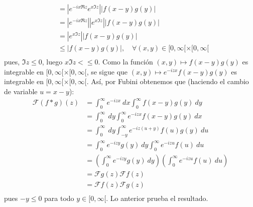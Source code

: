 \documentclass[12pt]{report}
\theoremstyle{largebreak}
\renewcommand{\leq}{\ensuremath{\leqslant}}
\newcommand\abs[1]{\ensuremath{\left|#1\right|}}
\newcommand{\fou}[1]{\ensuremath{\mathcal{F}#1}}
\begin{document}
\begin{sol}
\begin{equation*}
\begin{split}
                &=\abs{e^{ -ix\Re z}e^{x\Im z}}\abs{f(x-y)g(y)}\\
                &=\abs{e^{ -ix\Re z}}\abs{e^{x\Im z}}\abs{f(x-y)g(y)}\\
                &=\abs{e^{x\Im z}}\abs{f(x-y)g(y)}\\
                &\leq\abs{f(x-y)g(y)},\quad\forall (x,y)\in[0,\infty[\times[0,\infty[\\
            \end{split}
        \end{equation*}
        pues, $\Im z\leq 0$, luego $x\Im z<\leq0$. Como la función $(x,y)\mapsto f(x-y)g(y)$ es integrable en $[0,\infty[\times[0,\infty[$, se sigue que $(x,y)\mapsto e^{ -izx}f(x-y)g(y)$ es integrable en $[0,\infty[\times[0,\infty[$. Así, por Fubini obtenemos que (haciendo el cambio de variable $u=x-y$):
        \begin{equation*}
            \begin{split}
                \fou{(f*g)}(z)&=\int_0^{\infty}e^{ -izx}\:dx\int_{0}^{\infty}f(x-y)g(y)\:dy\\
                &=\int_0^{\infty}\:dy\int_{0}^{\infty}e^{-izx}f(x-y)g(y)\:dx\\
                &=\int_0^{\infty}\:dy\int_{-y}^{\infty}e^{-iz(u+y)}f(u)g(y)\:du\\
                &=\int_0^{\infty} e^{-izy}g(y)\:dy\int_{0}^{\infty}e^{-izu}f(u)\:du\\
                &=\left(\int_0^{\infty} e^{-izy}g(y)\:dy\right)\left(\int_{0}^{\infty}e^{-izu}f(u)\:du\right)\\
                &=\fou{g}(z)\fou{f}(z)\\
                &=\fou{f}(z)\fou{g}(z)\\
            \end{split}
        \end{equation*}
        pues $-y\leq0$ para todo $y\in[0,\infty[$. Lo anterior prueba el resultado.


\end{sol}
\end{document}
